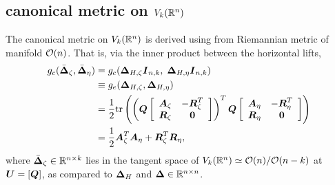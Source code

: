 \documentclass[11pt]{article}
\begin{document}



\subsection{canonical metric on $V_{k}({\mathbb R}^{n})$}
The canonical metric on $V_{k}({\mathbb R}^{n})$ is derived using from Riemannian metric of manifold ${\mathcal O}(n)$. That is, via the inner product between the horizontal lifts,  
\begin{align}
g_{c}(\bar{\boldsymbol{\Delta}}_{\zeta}, \bar{\boldsymbol{\Delta}}_{\eta}) &= g_{c}(\boldsymbol{\Delta}_{H,\zeta}\boldsymbol{I}_{n,k}, \;\boldsymbol{\Delta}_{H,\eta}\boldsymbol{I}_{n,k}) \nonumber\\
&\equiv g_{e}(\boldsymbol{\Delta}_{H, \zeta}, \boldsymbol{\Delta}_{H, \eta})\nonumber\\
&= \frac{1}{2}\mathrm{tr}\left(\left(\boldsymbol{Q}\left[\begin{array}{cc}
\boldsymbol{A}_{\zeta} & -\boldsymbol{R}_{\zeta}^{T} \\ 
\boldsymbol{R}_{\zeta} & \boldsymbol{0}
\end{array} \right] \right)^{T}\boldsymbol{Q}\left[\begin{array}{cc}
\boldsymbol{A}_{\eta} & -\boldsymbol{R}_{\eta}^{T} \\ 
\boldsymbol{R}_{\eta}& \boldsymbol{0}
\end{array} \right]    \right) \nonumber\\
&= \frac{1}{2}\boldsymbol{A}_{\zeta}^{T}\boldsymbol{A}_{\eta} + \boldsymbol{R}_{\zeta}^{T}\boldsymbol{R}_{\eta},  \label{eqn: can_metric_Stiefel}
\end{align} where $\bar{\boldsymbol{\Delta}}_{\zeta} \in {\mathbb R}^{n\times k}$ lies in the tangent space of $V_{k}({\mathbb R}^{n}) \simeq {\mathcal O}(n)/{\mathcal O}(n-k)$ at $\boldsymbol{U} = [\boldsymbol{Q}]$, as compared to $\boldsymbol{\Delta}_{H}$ and $\boldsymbol{\Delta} \in {\mathbb R}^{n\times n}$.
\end{document}
